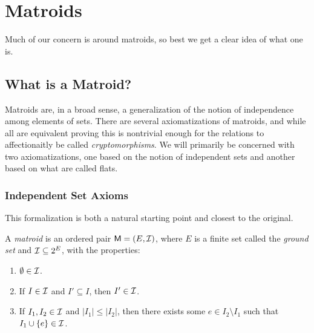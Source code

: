 \documentclass[12pt,oneside]{../../sfsuthesis}
\begin{document}
\chapter{Matroids}

Much of our concern is around matroids, so best we get a clear idea of what one is.

\section{What is a Matroid?}

Matroids are, in a broad sense, a generalization of the notion of independence among elements of sets.
There are several axiomatizations of matroids, and while all are equivalent proving this is nontrivial enough for the relations to affectionaitly be called \textit{cryptomorphisms}.
We will primarily be concerned with two axiomatizations, one based on the notion of independent sets and another based on what are called flats.



\subsection{Independent Set Axioms}

This formalization is both a natural starting point and closest to the original\cite{whitneyAbstractPropertiesLinear1935}.
\begin{definition}\label{def:MatroidIndpendentAxioms}
    A  \emph{matroid} is an ordered pair \( \mathsf{M} = (E, \mathcal{I}) \), where \( E \) is a finite set called the \emph{ground set} and \( \mathcal{I} \subseteq 2^E \), with the properties:
    \begin{enumerate}[label=\roman*.]
        \item \( \emptyset \in \mathcal{I} \).
        \item If \( I \in \mathcal{I} \) and \( I' \subseteq I \), then \( I' \in \mathcal{I} \).
        \item If \( I_1, I_2 \in \mathcal{I} \) and \( |I_1| \leq |I_2|\), then there exists some \( e \in I_2 \setminus I_1 \)
              such that \( I_1 \cup \{e\} \in \mathcal{I} \).
    \end{enumerate}
\end{definition}
\end{document}
